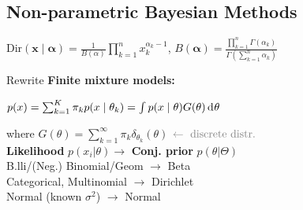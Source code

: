     
    
    

\subsection{Non-parametric Bayesian Methods}

$\mathrm{Dir}(\bm x \mid \bm\alpha) = \frac{1}{B(\alpha)} \prod_{k=1}^n x_k^{\alpha_k - 1}$,\enskip
$B(\bm\alpha) = \frac{ \prod_{k=1}^n \Gamma(\alpha_k)}{\Gamma(\sum_{k=1}^n \alpha_k)}$

Rewrite \textbf{Finite mixture models:}

$p(x) = \sum_{k=1}^K \pi_k p(x\mid \theta_k)
= \int p(x\mid\theta) G(\theta) \diff\theta$

where $G(\theta) = \sum_{k=1}^\infty \pi_k \delta_{\theta_k}\!(\theta)$
$\color{gray} \leftarrow \text{ discrete distr.}$\\
\textbf{Likelihood} $p(x_i | \theta) \to$ \textbf{Conj. prior} $p(\theta | \Theta)$\\
B.lli/(Neg.) Binomial/Geom ${\to}$ Beta\\
Categorical, Multinomial ${\to}$ Dirichlet\\
Normal (known $\sigma^2$) ${\to}$ Normal\\






